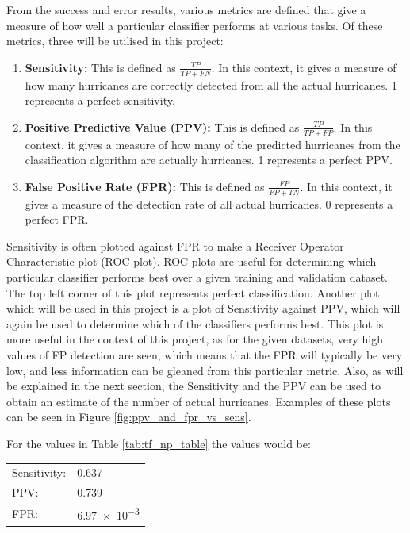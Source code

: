 \documentclass[pdftex,12pt,a4paper]{report}
\begin{document}
From the success and error results, various metrics are defined that give a measure of how well a
particular classifier performs at various tasks. Of these metrics, three will be utilised in this
project:

\begin{enumerate}
    \item \textbf{Sensitivity:} This is defined as $\frac{TP}{TP + FN}$. In this context, it gives a
        measure of how many hurricanes are correctly detected from all the actual hurricanes. 1
        represents a perfect sensitivity.
    \item \textbf{Positive Predictive Value (PPV):} This is defined as $\frac{TP}{TP + FP}$. In this
        context, it gives a measure of how many of the predicted hurricanes from the classification
        algorithm are actually hurricanes. 1 represents a perfect PPV.
    \item \textbf{False Positive Rate (FPR):} This is defined as $\frac{FP}{FP + TN}$. In this
        context, it gives a measure of the detection rate of all actual hurricanes. 0 represents a
        perfect FPR.
\end{enumerate}

Sensitivity is often plotted against FPR to make a Receiver Operator Characteristic plot (ROC plot).
ROC plots are useful for determining which particular classifier performs best over a given training
and validation dataset. The top left corner of this plot represents perfect classification. Another
plot which will be used in this project is a plot of Sensitivity against PPV, which will again
be used to determine which of the classifiers performs best. This plot is more useful in the context
of this project, as for the given datasets, very high values of FP detection are seen, which means
that the FPR will typically be very low, and less information can be gleaned from this particular
metric. Also, as will be explained in the next section, the Sensitivity and the PPV can be used to
obtain an estimate of the number of actual hurricanes. Examples of these plots can be seen in
Figure \ref{fig:ppv_and_fpr_vs_sens}.

For the values in Table \ref{tab:tf_np_table} the values would be:

\begin{table}[hb!]
    \centering
    \begin{tabular}{ l l }
        Sensitivity: & \SI{0.637}{} \\
        PPV: & \SI{0.739}{} \\
        FPR: & \SI{6.97e-3}{} \\
    \end{tabular}
    \label{tab:success_metric_table}
\end{table}
\end{document}

